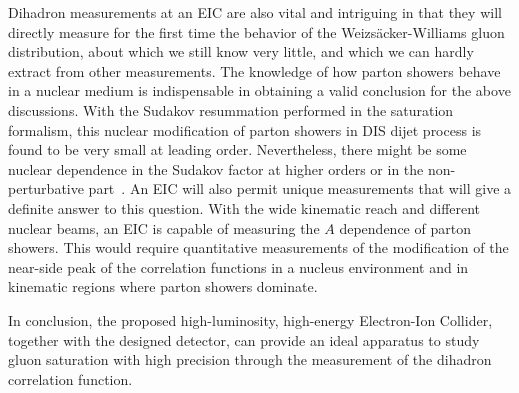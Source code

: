 Dihadron measurements at an EIC are also vital and intriguing in
that they will directly measure for the first time the behavior of the Weizs\"{a}cker-Williams
gluon distribution, about which we still know very little, and which we
can hardly extract from other measurements. The knowledge of how parton showers
behave in a nuclear medium is indispensable in obtaining a valid conclusion for the
above discussions. With the Sudakov resummation performed in the saturation
formalism, this nuclear modification of parton showers in DIS dijet process is
found to be very small at leading order. Nevertheless, there might be some
nuclear dependence in the Sudakov factor at higher orders or in the
non-perturbative part~\cite{Kang:2012am}. An EIC will also permit unique measurements
that will give a definite answer to this question. With the wide kinematic
reach and different nuclear beams, an EIC is capable of measuring the $A$
dependence of parton showers. This would require quantitative measurements of
the modification of the near-side peak of the correlation functions in a 
nucleus environment and in kinematic regions where parton showers dominate.

In conclusion, the proposed high-luminosity, high-energy Electron-Ion Collider,
together with the designed detector, can provide an ideal apparatus to study
gluon saturation with high precision through the measurement of 
the dihadron correlation function.



